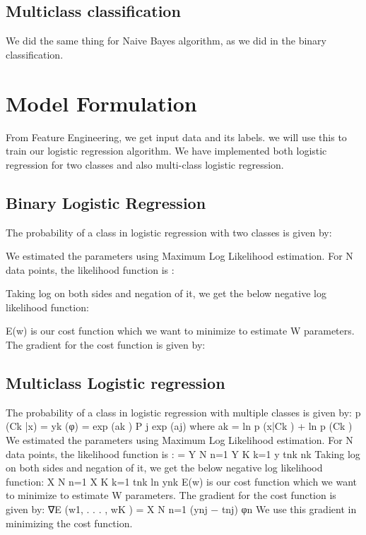\documentclass{article}
\begin{document}
\subsection{Multiclass classification}


We did the same thing for Naive Bayes algorithm, as we did in the binary classification.



\section{Model Formulation}
From Feature Engineering, we get input data and its labels. we will use this to train our logistic regression algorithm. We have implemented both logistic regression for two classes and also multi-class logistic regression.
\subsection{Binary Logistic Regression}
The probability of a class in logistic regression with two classes is given by:



We estimated the parameters using Maximum Log Likelihood estimation. For N data points, the likelihood function is : 


Taking log on both sides and negation of it, we get the below negative log likelihood function:


E(w) is our cost function which we want to minimize to estimate W parameters. The gradient for the cost function is given by:



\subsection{Multiclass Logistic regression}
The probability of a class in logistic regression with multiple classes is given by:
p (Ck |x) = yk (φ) = exp (ak ) P j exp (aj) where ak = ln p (x|Ck ) + ln p (Ck )
We estimated the parameters using Maximum Log Likelihood estimation. For N data points, the likelihood function is : 
= Y N n=1 Y K k=1 y tnk nk
Taking log on both sides and negation of it, we get the below negative log likelihood function:
X N n=1 X K k=1 tnk ln ynk
E(w) is our cost function which we want to minimize to estimate W parameters. The gradient for the cost function is given by:
∇E (w1, . . . , wK ) = X N n=1 (ynj − tnj) φn
We use this gradient in minimizing the cost function.
\end{document}
